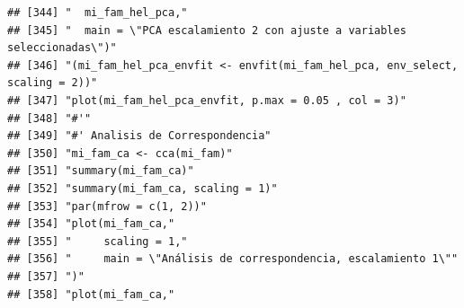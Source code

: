 \documentclass[11pt,]{article}
\begin{document}
\begin{verbatim}
## [344] "  mi_fam_hel_pca,"                                                                                                                                                     
## [345] "  main = \"PCA escalamiento 2 con ajuste a variables seleccionadas\")"                                                                                                 
## [346] "(mi_fam_hel_pca_envfit <- envfit(mi_fam_hel_pca, env_select, scaling = 2))"                                                                                            
## [347] "plot(mi_fam_hel_pca_envfit, p.max = 0.05 , col = 3)"                                                                                                                   
## [348] "#'"                                                                                                                                                                    
## [349] "#' Analisis de Correspondencia"                                                                                                                                        
## [350] "mi_fam_ca <- cca(mi_fam)"                                                                                                                                              
## [351] "summary(mi_fam_ca)"                                                                                                                                                    
## [352] "summary(mi_fam_ca, scaling = 1)"                                                                                                                                       
## [353] "par(mfrow = c(1, 2))"                                                                                                                                                  
## [354] "plot(mi_fam_ca,"                                                                                                                                                       
## [355] "     scaling = 1,"                                                                                                                                                     
## [356] "     main = \"Análisis de correspondencia, escalamiento 1\""                                                                                                           
## [357] ")"                                                                                                                                                                     
## [358] "plot(mi_fam_ca,"                                                                                                                                                       

\end{verbatim}
\end{document}
